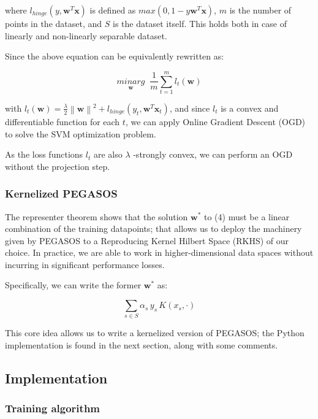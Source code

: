 \documentclass[a4paper]{article}
\begin{document}
where \(l_{hinge}(y, \boldsymbol{w}^T \boldsymbol{x})\) is defined as \(max(0, 1 - y \boldsymbol{w}^T \boldsymbol{x})\), \(m\) is the number of points in the dataset, and \(S\) is the dataset itself. This holds both in case of linearly and non-linearly separable dataset.

Since the above equation can be equivalently rewritten as:

\begin{equation}
\underset{\boldsymbol{w}}{minarg} \; \; \frac{1}{m} \sum_{t=1}^{m} l_t(\boldsymbol{w})
\end{equation}

with \(l_t(\boldsymbol{w}) = \frac{\lambda}{2}\left \| \boldsymbol{w} \right \|^2 + l_{hinge}(y_t, \boldsymbol{w}^T \boldsymbol{x}_t )\), and since \(l_t\) is a convex and differentiable function for each \(t\), we can apply Online Gradient Descent (OGD) to solve the SVM optimization problem.

As the loss functions \(l_t\) are also \(\lambda\) -strongly convex, we can perform an OGD without the projection step. 

\subsubsection{Kernelized PEGASOS}
\label{sec:orge0b09eb}
\label{orgdedb175}

The representer theorem shows that the solution \(\boldsymbol{w}^*\) to (4) must be a linear combination of the training datapoints; that allows us to deploy the machinery given by PEGASOS to a Reproducing Kernel Hilbert Space (RKHS) of our choice. In practice, we are able to work in higher-dimensional data spaces without incurring in significant performance losses.

Specifically, we can write the former \(\boldsymbol{w}^*\) as: 

\begin{equation}
\sum_{s \in S} \alpha_s \, y_s \, K(x_s, \cdot )
\end{equation}

This core idea allows us to write a kernelized version of PEGASOS; the Python implementation is found in the next section, along with some comments.

\subsection{Implementation}
\label{sec:org7c78fa2}

\subsubsection{Training algorithm}
\label{sec:org5f54f1b}
\end{document}
